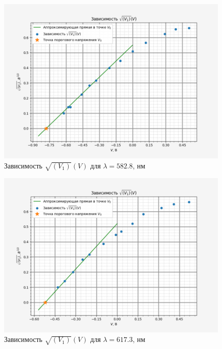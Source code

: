 \begin{enumerate}
        \begin{figure}[H]
            \centering
            \includegraphics[width = 12 cm]{images/plot_2}
            \caption{Зависимость $\sqrt{(V_1)}(V)$ для $\lambda = 582.8$, нм}
            \label{V_V1_2}
        \end{figure}

        \begin{figure}[H]
            \centering
            \includegraphics[width = 12 cm]{images/plot_3}
            \caption{Зависимость $\sqrt{(V_1)}(V)$ для $\lambda = 617.3$, нм}
            \label{V_V1_3}
        \end{figure}


\end{enumerate}
